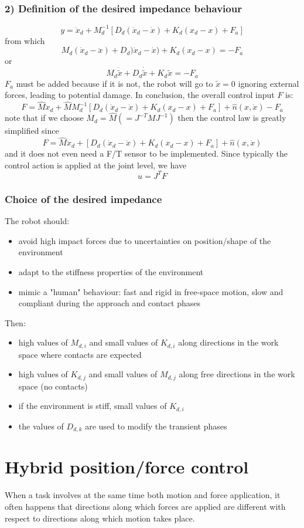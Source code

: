 \documentclass{book}
\begin{document}
\subsubsection{2) Definition of the desired impedance behaviour}
\[
    y=\ddot{x}_d+M_d^{-1}[D_d(\dot{x}_d-\dot{x})+K_d(x_d-x)+F_a]
\]
from which
\[
    M_d(\dot{x}_d-\ddot{x})+D_d)\dot{x}_d-\dot{x})+K_d(x_d-x)=-F_a
\]
or 
\[
    M_d\ddot{\tilde{x}}+D_d\dot{\tilde{x}}+K_d\tilde{x}=-F_a
\]
$F_a$ must be added because if it is not, the robot will go to $\tilde{x}=0$ ignoring external forces, leading to potential damage.
In conclusion, the overall control input $F$ is:
\[
    F = \hat{M}\ddot{x}_d +\hat{M}M_d^{-1}[D_d(\dot{x}_d-\dot{x})+K_d(x_d-x)+F_a]+\hat{n}(x,\dot{x})-F_a
\]
note that if we choose $M_d=\hat{M} (=J^{-T}MJ^{-1})$ then the control law is greatly simplified since 
\[
    F = \hat{M}\ddot{x}_d+[D_d(\dot{x}_d-\dot{x})+K_d(x_d-x)+F_a]+\hat{n}(x,\dot{x})
\]
and it does not even need a F/T sensor to be implemented. Since typically the control action is applied at the joint level, we have 
\[
    u=J^TF
\]
\subsubsection{Choice of the desired impedance}
The robot should:
\begin{itemize}
    \item avoid high impact forces due to uncertainties on position/shape of the environment 
    \item adapt to the stiffness properties of the environment 
    \item mimic a "human" behaviour: fast and rigid in free-space motion, slow and compliant during the approach and contact phases 
\end{itemize}
Then:
\begin{itemize}
    \item high values of $M_{d,i}$ and small values of $K_{d,i}$ along directions in the work space where contacts are expected 
    \item high values of $K_{d,j}$ and small values of $M_{d,j}$ along free directions in the work space (no contacts) 
    \item if the environment is stiff, small values of $K_{d,i}$ 
    \item the values of $D_{d,k}$ are used to modify the transient phases
\end{itemize}

\section{Hybrid position/force control}
When a task involves at the same time both motion and force application, it often happens that directions along which forces are applied are different with respect to directions along which motion takes place.
\end{document}
